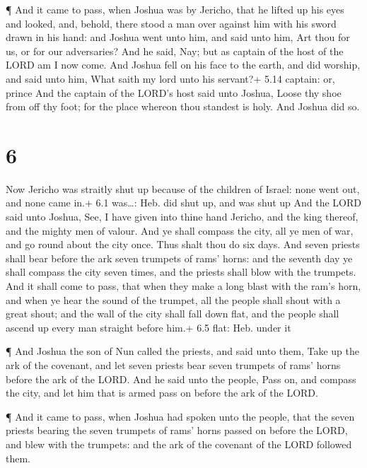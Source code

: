  ¶ And it came to pass, when Joshua was by Jericho, that he
lifted up his eyes and looked, and, behold, there stood a man over
against him with his sword drawn in his hand: and Joshua went unto him,
and said unto him, Art thou for us, or for our adversaries?
 And he said, Nay; but as captain of the host of the LORD
am I now come. And Joshua fell on his face to the earth, and did
worship, and said unto him, What saith my lord unto his servant?+ 5.14
captain: or, prince  And the captain of the LORD's host
said unto Joshua, Loose thy shoe from off thy foot; for the place
whereon thou standest is holy. And Joshua did so.

\hypertarget{section-5}{%
\section{6}\label{section-5}}

 Now Jericho was straitly shut up because of the children of
Israel: none went out, and none came in.+ 6.1 was\ldots: Heb. did shut
up, and was shut up  And the LORD said unto Joshua, See, I
have given into thine hand Jericho, and the king thereof, and the mighty
men of valour.  And ye shall compass the city, all ye men of
war, and go round about the city once. Thus shalt thou do six days.
 And seven priests shall bear before the ark seven trumpets
of rams' horns: and the seventh day ye shall compass the city seven
times, and the priests shall blow with the trumpets.  And it
shall come to pass, that when they make a long blast with the ram's
horn, and when ye hear the sound of the trumpet, all the people shall
shout with a great shout; and the wall of the city shall fall down flat,
and the people shall ascend up every man straight before him.+ 6.5 flat:
Heb. under it

 ¶ And Joshua the son of Nun called the priests, and said
unto them, Take up the ark of the covenant, and let seven priests bear
seven trumpets of rams' horns before the ark of the LORD. 
And he said unto the people, Pass on, and compass the city, and let him
that is armed pass on before the ark of the LORD.

 ¶ And it came to pass, when Joshua had spoken unto the
people, that the seven priests bearing the seven trumpets of rams' horns
passed on before the LORD, and blew with the trumpets: and the ark of
the covenant of the LORD followed them.

